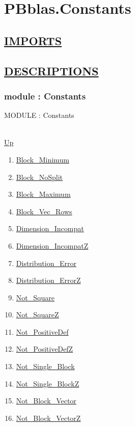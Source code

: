 \chapter*{PBblas.Constants}
\hypertarget{PBblas.Constants}{}

\section*{\underline{IMPORTS}}

\section*{\underline{DESCRIPTIONS}}
\subsection*{module : Constants}
\hypertarget{ecldoc:PBblas.Constants}{MODULE : Constants} \\
\hyperlink{ecldoc:}{Up} \\
\par
\begin{enumerate}
\item \hyperlink{ecldoc:pbblas.constants.block_minimum}{Block\_Minimum}
\item \hyperlink{ecldoc:pbblas.constants.block_nosplit}{Block\_NoSplit}
\item \hyperlink{ecldoc:pbblas.constants.block_maximum}{Block\_Maximum}
\item \hyperlink{ecldoc:pbblas.constants.block_vec_rows}{Block\_Vec\_Rows}
\item \hyperlink{ecldoc:pbblas.constants.dimension_incompat}{Dimension\_Incompat}
\item \hyperlink{ecldoc:pbblas.constants.dimension_incompatz}{Dimension\_IncompatZ}
\item \hyperlink{ecldoc:pbblas.constants.distribution_error}{Distribution\_Error}
\item \hyperlink{ecldoc:pbblas.constants.distribution_errorz}{Distribution\_ErrorZ}
\item \hyperlink{ecldoc:pbblas.constants.not_square}{Not\_Square}
\item \hyperlink{ecldoc:pbblas.constants.not_squarez}{Not\_SquareZ}
\item \hyperlink{ecldoc:pbblas.constants.not_positivedef}{Not\_PositiveDef}
\item \hyperlink{ecldoc:pbblas.constants.not_positivedefz}{Not\_PositiveDefZ}
\item \hyperlink{ecldoc:pbblas.constants.not_single_block}{Not\_Single\_Block}
\item \hyperlink{ecldoc:pbblas.constants.not_single_blockz}{Not\_Single\_BlockZ}
\item \hyperlink{ecldoc:pbblas.constants.not_block_vector}{Not\_Block\_Vector}
\item \hyperlink{ecldoc:pbblas.constants.not_block_vectorz}{Not\_Block\_VectorZ}
\end{enumerate}
